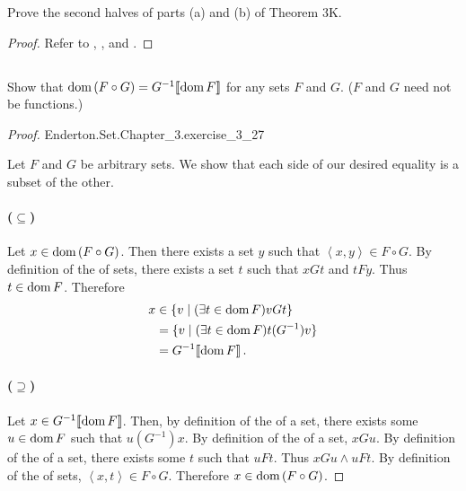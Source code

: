 \documentclass{report}
\begin{document}
Prove the second halves of parts (a) and (b) of Theorem 3K.

\begin{proof}

  Refer to , , and
    .

\end{proof}

\subsection{}%
\label{sub:exercise-3.27}

Show that $\mathop{\text{dom}}{(F \circ G)} = G^{-1}\!\left\llbracket\mathop{\text{dom}}{F}\right\rrbracket$ for any sets $F$ and $G$.
($F$ and $G$ need not be functions.)

\begin{proof}

    {Enderton.Set.Chapter\_3.exercise\_3\_27}

  Let $F$ and $G$ be arbitrary sets.
  We show that each side of our desired equality is a subset of the other.

  \paragraph{($\subseteq$)}%

    Let $x \in \mathop{\text{dom}}{(F \circ G)}$.
    Then there exists a set $y$ such that $\left< x, y \right> \in F \circ G$.
    By definition of the  of sets, there exists a set
      $t$ such that $xGt$ and $tFy$.
    Thus $t \in \mathop{\text{dom}}{F}$.
    Therefore
      \begin{align*}
        x
          & \in \{v \mid (\exists t \in \mathop{\text{dom}}{F}) vGt\} \\
          & = \{v \mid (\exists t \in \mathop{\text{dom}}{F}) t(G^{-1})v\} \\
          & = G^{-1}\!\left\llbracket\mathop{\text{dom}}{F}\right\rrbracket.
      \end{align*}

  \paragraph{($\supseteq$)}%

    Let $x \in G^{-1}\!\left\llbracket\mathop{\text{dom}}{F}\right\rrbracket$.
    Then, by definition of the  of a set, there exists some
      $u \in \mathop{\text{dom}}{F}$ such that $u(G^{-1})x$.
    By definition of the  of a set, $xGu$.
    By definition of the  of a set, there exists some $t$
      such that $uFt$.
    Thus $xGu \land uFt$.
    By definition of the  of sets,
      $\left< x, t \right> \in F \circ G$.
    Therefore $x \in \mathop{\text{dom}}{(F \circ G)}$.

\end{proof}
\end{document}
